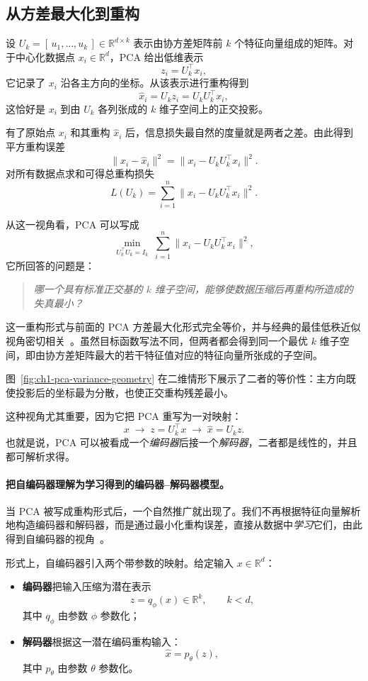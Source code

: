 \subsection{从方差最大化到重构}

设 \(U_k=[\,u_1,\dots,u_k\,]\in\mathbb{R}^{d\times k}\) 表示由协方差矩阵前 \(k\) 个特征向量组成的矩阵。对于中心化数据点 \(x_i\in\mathbb{R}^d\)，PCA 给出低维表示
\[
z_i = U_k^\top x_i,
\]
它记录了 \(x_i\) 沿各主方向的坐标。从该表示进行重构得到
\[
\hat{x}_i = U_k z_i = U_k U_k^\top x_i,
\]
这恰好是 \(x_i\) 到由 \(U_k\) 各列张成的 \(k\) 维子空间上的正交投影。

有了原始点 \(x_i\) 和其重构 \(\hat{x}_i\) 后，信息损失最自然的度量就是两者之差。由此得到平方重构误差
\[
\|x_i-\hat{x}_i\|^2
=
\|x_i-U_kU_k^\top x_i\|^2.
\]
对所有数据点求和可得总重构损失
\[
L(U_k)
=
\sum_{i=1}^n \|x_i-U_kU_k^\top x_i\|^2.
\]

从这一视角看，PCA 可以写成
\[
\min_{U_k^\top U_k=I_k}
\;
\sum_{i=1}^n \|x_i-U_kU_k^\top x_i\|^2,
\]
它所回答的问题是：
\begin{quote}
\emph{哪一个具有标准正交基的 \(k\) 维子空间，能够使数据压缩后再重构所造成的失真最小？}
\end{quote}

这一重构形式与前面的 PCA 方差最大化形式完全等价，并与经典的最佳低秩近似视角密切相关~\cite{jolliffe2016pca}。虽然目标函数写法不同，但两者都会得到同一个最优 \(k\) 维子空间，即由协方差矩阵最大的若干特征值对应的特征向量所张成的子空间。

图~\ref{fig:ch1-pca-variance-geometry} 在二维情形下展示了二者的等价性：主方向既使投影后的坐标最为分散，也使正交重构残差最小。



这种视角尤其重要，因为它把 PCA 重写为一对映射：
\[
x\;\longrightarrow\;z=U_k^\top x
\;\longrightarrow\;\hat{x}=U_k z.
\]
也就是说，PCA 可以被看成一个\emph{编码器}后接一个\emph{解码器}，二者都是线性的，并且都可解析求得。

\paragraph{把自编码器理解为学习得到的编码器--解码器模型。}

当 PCA 被写成重构形式后，一个自然推广就出现了。我们不再根据特征向量解析地构造编码器和解码器，而是通过最小化重构误差，直接从数据中\emph{学习}它们，由此得到自编码器的视角~\cite{baldi1989neural,hinton2006reducing}。

形式上，自编码器引入两个带参数的映射。给定输入 \(x\in\mathbb{R}^d\)：
\begin{itemize}
    \item \textbf{编码器}把输入压缩为潜在表示
    \[
    z=q_\phi(x)\in\mathbb{R}^k,\qquad k<d,
    \]
    其中 \(q_\phi\) 由参数 \(\phi\) 参数化；

    \item \textbf{解码器}根据这一潜在编码重构输入：
    \[
    \hat{x}=p_\theta(z),
    \]
    其中 \(p_\theta\) 由参数 \(\theta\) 参数化。
\end{itemize}

